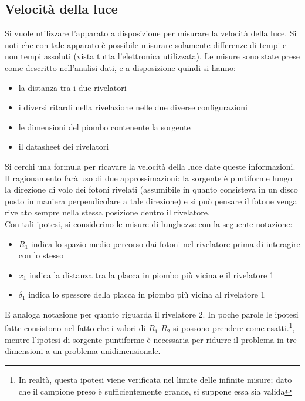 \subsection{Velocità della luce}

Si vuole utilizzare l'apparato a disposizione per misurare la velocità della luce. Si noti che con tale apparato è possibile misurare solamente differenze di tempi
e non tempi assoluti (vista tutta l'elettronica utilizzata). Le misure sono state prese come descritto nell'analisi dati, e a disposizione quindi si hanno:
\begin{itemize}
\item la distanza tra i due rivelatori
\item i diversi ritardi nella rivelazione nelle due diverse configurazioni
\item le dimensioni del piombo contenente la sorgente
\item il datasheet dei rivelatori
\end{itemize}
Si cerchi una formula per ricavare la velocità della luce date queste informazioni. Il ragionamento farà uso di due approssimazioni: la sorgente è puntiforme lungo la direzione
di volo dei fotoni rivelati (assumibile in quanto consisteva in un disco posto in maniera perpendicolare a tale direzione)
e si può pensare il fotone venga rivelato sempre nella stessa posizione dentro il rivelatore.\\

Con tali ipotesi, si considerino le misure di lunghezze con la seguente notazione:
\begin{itemize}
\item $R_1$ indica lo spazio medio percorso dai fotoni nel rivelatore prima di interagire con lo stesso
\item $x_1$ indica la distanza tra la placca in piombo più vicina e il rivelatore 1
\item $\delta_1$ indica lo spessore della placca in piombo più vicina al rivelatore 1
\end{itemize}
E analoga notazione per quanto riguarda il rivelatore 2. In poche parole le ipotesi fatte consistono nel fatto che i valori di $R_1$ $R_2$ si possono prendere
come esatti.\footnote{In realtà, questa ipotesi viene verificata nel limite delle infinite misure; dato che il campione preso è sufficientemente grande, si suppone essa sia
valida}, mentre l'ipotesi di sorgente puntiforme è necessaria per ridurre il problema in tre dimensioni a un problema unidimensionale.\\


